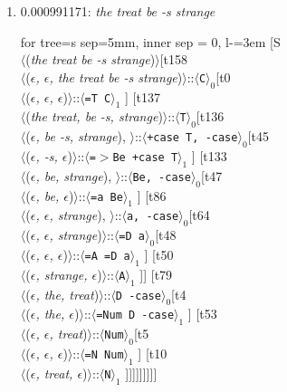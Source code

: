 \documentclass[11pt]{article}
\begin{document}
\begin{enumerate}
	\item  0.000991171: \textit{the treat be -s strange} \\[0.5em]
	\begin{adjustbox}{max width = \textwidth}
	\begin{forest}
	for tree={s sep=5mm, inner sep = 0, l-=3em}
	[S\\$\langle$(\textit{the treat be -s strange})$\rangle$[t158\\$\langle$(\textit{$\epsilon${,} $\epsilon${,} the treat be -s strange})$\rangle$::$\langle$\texttt{C}$\rangle_0$[t0\\$\langle$(\textit{$\epsilon${,} $\epsilon${,} $\epsilon$})$\rangle$::$\langle$\texttt{{=}T C}$\rangle_1$ ] [t137\\$\langle$(\textit{the treat{,} be -s{,} strange})$\rangle$::$\langle$\texttt{T}$\rangle_0$[t136\\$\langle$(\textit{$\epsilon${,} be -s{,} strange}){,} $\rangle$::$\langle$\texttt{+case T{,} -case}$\rangle_0$[t45\\$\langle$(\textit{$\epsilon${,} -s{,} $\epsilon$})$\rangle$::$\langle$\texttt{{=}$>$Be +case T}$\rangle_1$ ] [t133\\$\langle$(\textit{$\epsilon${,} be{,} strange}){,} $\rangle$::$\langle$\texttt{Be{,} -case}$\rangle_0$[t47\\$\langle$(\textit{$\epsilon${,} be{,} $\epsilon$})$\rangle$::$\langle$\texttt{{=}a Be}$\rangle_1$ ] [t86\\$\langle$(\textit{$\epsilon${,} $\epsilon${,} strange}){,} $\rangle$::$\langle$\texttt{a{,} -case}$\rangle_0$[t64\\$\langle$(\textit{$\epsilon${,} $\epsilon${,} strange})$\rangle$::$\langle$\texttt{{=}D a}$\rangle_0$[t48\\$\langle$(\textit{$\epsilon${,} $\epsilon${,} $\epsilon$})$\rangle$::$\langle$\texttt{{=}A {=}D a}$\rangle_1$ ] [t50\\$\langle$(\textit{$\epsilon${,} strange{,} $\epsilon$})$\rangle$::$\langle$\texttt{A}$\rangle_1$ ]] [t79\\$\langle$(\textit{$\epsilon${,} the{,} treat})$\rangle$::$\langle$\texttt{D -case}$\rangle_0$[t4\\$\langle$(\textit{$\epsilon${,} the{,} $\epsilon$})$\rangle$::$\langle$\texttt{{=}Num D -case}$\rangle_1$ ] [t53\\$\langle$(\textit{$\epsilon${,} $\epsilon${,} treat})$\rangle$::$\langle$\texttt{Num}$\rangle_0$[t5\\$\langle$(\textit{$\epsilon${,} $\epsilon${,} $\epsilon$})$\rangle$::$\langle$\texttt{{=}N Num}$\rangle_1$ ] [t10\\$\langle$(\textit{$\epsilon${,} treat{,} $\epsilon$})$\rangle$::$\langle$\texttt{N}$\rangle_1$ ]]]]]]]]]

\end{forest}
\end{adjustbox}
\end{enumerate}
\end{document}
